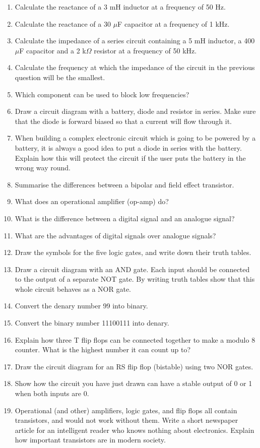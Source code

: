 \begin{eocexercises}{}
\begin{enumerate}
\item Calculate the reactance of a 3 mH inductor at a frequency of 50 Hz.
\item Calculate the reactance of a 30 $\mu$F capacitor at a frequency of 1 kHz.
\item Calculate the impedance of a series circuit containing a 5 mH inductor, a 400 $\mu$F capacitor and a 2 k$\Omega$ resistor at a frequency of 50 kHz.
\item Calculate the frequency at which the impedance of the circuit in the previous question will be the smallest.
\item Which component can be used to block low frequencies?
\item Draw a circuit diagram with a battery, diode and resistor in series.  Make sure that the diode is forward biased so that a current will flow through it.
\item When building a complex electronic circuit which is going to be powered by a battery, it is always a good idea to put a diode in series with the battery.  Explain how this will protect the circuit if the user puts the battery in the wrong way round.
\item Summarise the differences between a bipolar and field effect transistor.
\item What does an operational amplifier (op-amp) do?
\item What is the difference between a digital signal and an analogue signal?
\item What are the advantages of digital signals over analogue signals?
\item Draw the symbols for the five logic gates, and write down their truth tables.
\item Draw a circuit diagram with an AND gate.  Each input should be connected to the output of a separate NOT gate.  By writing truth tables show that this whole circuit behaves as a NOR gate.
\item Convert the denary number 99 into binary.
\item Convert the binary number 11100111 into denary.
\item Explain how three T flip flops can be connected together to make a modulo 8 counter.  What is the highest number it can count up to?
\item Draw the circuit diagram for an RS flip flop (bistable) using two NOR gates.
\item Show how the circuit you have just drawn can have a stable output of 0 or 1 when both inputs are 0.
\item Operational (and other) amplifiers, logic gates, and flip flops all contain transistors, and would not work without them.  Write a short newspaper article for an intelligent reader who knows nothing about electronics. Explain how important transistors are in modern society.
\end{enumerate}


\end{eocexercises}
